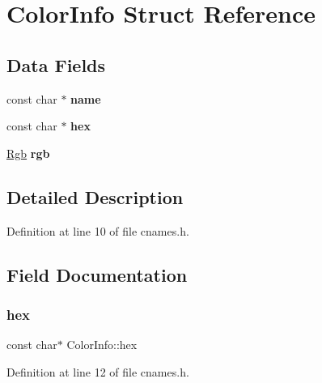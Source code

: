 \hypertarget{struct_color_info}{}\section{Color\+Info Struct Reference}
\label{struct_color_info}
\subsection*{Data Fields}
\begin{DoxyCompactItemize}
\item 
\mbox{\label{struct_color_info_ace286a57c75f465113f3fa68800eb0ff}} 
const char $\ast$ {\bfseries name}
\item 
\mbox{\label{struct_color_info_a1cd69aeba7e0a78c70e775a19a88eab5}} 
const char $\ast$ {\bfseries hex}
\item 
\mbox{\label{struct_color_info_a088bdf4ce19ae9cc8200062159164dc8}} 
\hyperlink{palette_8h_struct_rgb}{Rgb} {\bfseries rgb}
\end{DoxyCompactItemize}


\subsection{Detailed Description}


Definition at line 10 of file cnames.\+h.



\subsection{Field Documentation}
\mbox{\label{struct_color_info_a1cd69aeba7e0a78c70e775a19a88eab5}} 
\subsubsection{\texorpdfstring{hex}{hex}}
{\footnotesize\ttfamily const char$\ast$ Color\+Info\+::hex}



Definition at line 12 of file cnames.\+h.

\mbox{\label{struct_color_info_ace286a57c75f465113f3fa68800eb0ff}} 
